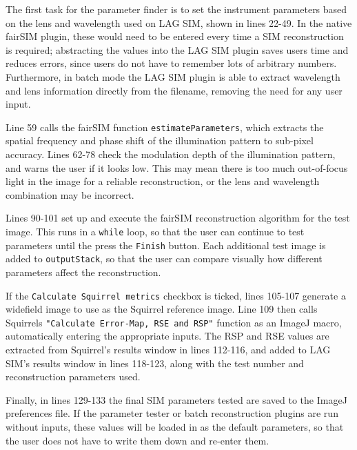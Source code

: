 The first task for the parameter finder is to set the instrument parameters based on the lens and wavelength used on LAG SIM, shown in lines 22-49. 
In the native fairSIM plugin, these would need to be entered every time a SIM reconstruction is required; abstracting the values into the LAG SIM plugin saves users time and reduces errors, since users do not have to remember lots of arbitrary numbers. 
Furthermore, in batch mode the LAG SIM plugin is able to extract wavelength and lens information directly from the filename, removing the need for any user input. 

Line 59 calls the fairSIM function \texttt{estimateParameters}, which extracts the spatial frequency and phase shift of the illumination pattern to sub-pixel accuracy. 
Lines 62-78 check the modulation depth of the illumination pattern, and warns the user if it looks low.
This may mean there is too much out-of-focus light in the image for a reliable reconstruction, or the lens and wavelength combination may be incorrect. 

Lines 90-101 set up and execute the fairSIM reconstruction algorithm for the test image.
This runs in a \texttt{while} loop, so that the user can continue to test parameters until the press the \texttt{Finish} button. 
Each additional test image is added to \texttt{outputStack}, so that the user can compare visually how different parameters affect the reconstruction. 

If the \texttt{Calculate Squirrel metrics} checkbox is ticked, lines 105-107 generate a widefield image to use as the Squirrel reference image. 
Line 109 then calls Squirrels \texttt{"Calculate Error-Map, RSE and RSP"} function as an ImageJ macro, automatically entering the appropriate inputs. 
The RSP and RSE values are extracted from Squirrel's results window in lines 112-116, and added to LAG SIM's results window in lines 118-123, along with the test number and reconstruction parameters used. 

Finally, in lines 129-133 the final SIM parameters tested are saved to the ImageJ preferences file. 
If the parameter tester or batch reconstruction plugins are run without inputs, these values will be loaded in as the default parameters, so that the user does not have to write them down and re-enter them. 

